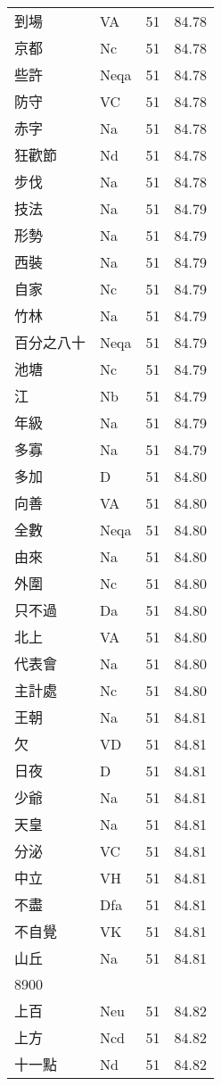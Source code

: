 \documentclass[twocolumn]{book}
\begin{document}
\begin{supertabular}{llrr}
到場 & VA & 51 &  84.78\\
京都 & Nc & 51 &  84.78\\
些許 & Neqa & 51 &  84.78\\
防守 & VC & 51 &  84.78\\
赤字 & Na & 51 &  84.78\\
狂歡節 & Nd & 51 &  84.78\\
步伐 & Na & 51 &  84.78\\
技法 & Na & 51 &  84.79\\
形勢 & Na & 51 &  84.79\\
西裝 & Na & 51 &  84.79\\
自家 & Nc & 51 &  84.79\\
竹林 & Na & 51 &  84.79\\
百分之八十 & Neqa & 51 &  84.79\\
池塘 & Nc & 51 &  84.79\\
江 & Nb & 51 &  84.79\\
年級 & Na & 51 &  84.79\\
多寡 & Na & 51 &  84.79\\
多加 & D & 51 &  84.80\\
向善 & VA & 51 &  84.80\\
全數 & Neqa & 51 &  84.80\\
由來 & Na & 51 &  84.80\\
外圍 & Nc & 51 &  84.80\\
只不過 & Da & 51 &  84.80\\
北上 & VA & 51 &  84.80\\
代表會 & Na & 51 &  84.80\\
主計處 & Nc & 51 &  84.80\\
王朝 & Na & 51 &  84.81\\
欠 & VD & 51 &  84.81\\
日夜 & D & 51 &  84.81\\
少爺 & Na & 51 &  84.81\\
天皇 & Na & 51 &  84.81\\
分泌 & VC & 51 &  84.81\\
中立 & VH & 51 &  84.81\\
不盡 & Dfa & 51 &  84.81\\
不自覺 & VK & 51 &  84.81\\
山丘 & Na & 51 &  84.81\\
8900\\
上百 & Neu & 51 &  84.82\\
上方 & Ncd & 51 &  84.82\\
十一點 & Nd & 51 &  84.82\\

\end{supertabular}
\end{document}

